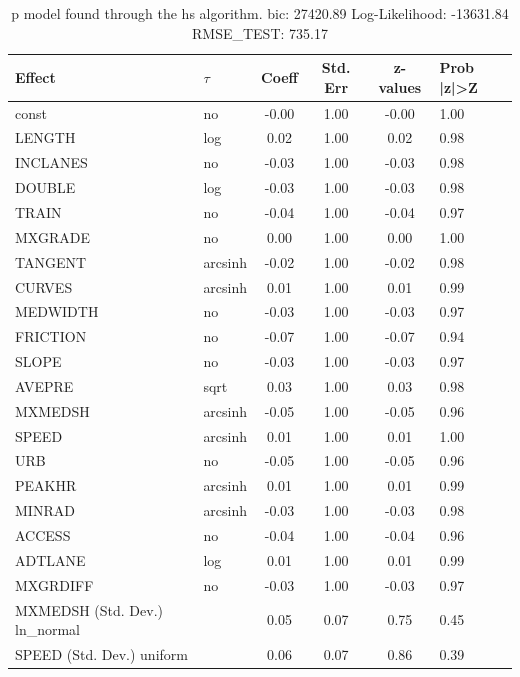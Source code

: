 \begin{table}
	\caption{p model found through the hs algorithm. bic: 27420.89 Log-Likelihood: -13631.84 RMSE_TEST: 735.17}
	\begin{center}
		\begin{tabular}{|l|l|c|c|c|l|}
			\hline
			Effect & $\tau$ & Coeff & Std. Err & z-values & Prob |z|>Z \\
			\hline
			const & no & -0.00 & 1.00 & -0.00 & 1.00 \\
			\hline
			LENGTH & log & 0.02 & 1.00 & 0.02 & 0.98 \\
			\hline
			INCLANES & no & -0.03 & 1.00 & -0.03 & 0.98 \\
			\hline
			DOUBLE & log & -0.03 & 1.00 & -0.03 & 0.98 \\
			\hline
			TRAIN & no & -0.04 & 1.00 & -0.04 & 0.97 \\
			\hline
			MXGRADE & no & 0.00 & 1.00 & 0.00 & 1.00 \\
			\hline
			TANGENT & arcsinh & -0.02 & 1.00 & -0.02 & 0.98 \\
			\hline
			CURVES & arcsinh & 0.01 & 1.00 & 0.01 & 0.99 \\
			\hline
			MEDWIDTH & no & -0.03 & 1.00 & -0.03 & 0.97 \\
			\hline
			FRICTION & no & -0.07 & 1.00 & -0.07 & 0.94 \\
			\hline
			SLOPE & no & -0.03 & 1.00 & -0.03 & 0.97 \\
			\hline
			AVEPRE & sqrt & 0.03 & 1.00 & 0.03 & 0.98 \\
			\hline
			MXMEDSH & arcsinh & -0.05 & 1.00 & -0.05 & 0.96 \\
			\hline
			SPEED & arcsinh & 0.01 & 1.00 & 0.01 & 1.00 \\
			\hline
			URB & no & -0.05 & 1.00 & -0.05 & 0.96 \\
			\hline
			PEAKHR & arcsinh & 0.01 & 1.00 & 0.01 & 0.99 \\
			\hline
			MINRAD & arcsinh & -0.03 & 1.00 & -0.03 & 0.98 \\
			\hline
			ACCESS & no & -0.04 & 1.00 & -0.04 & 0.96 \\
			\hline
			ADTLANE & log & 0.01 & 1.00 & 0.01 & 0.99 \\
			\hline
			MXGRDIFF & no & -0.03 & 1.00 & -0.03 & 0.97 \\
			\hline
			MXMEDSH (Std. Dev.) ln_normal &  & 0.05 & 0.07 & 0.75 & 0.45 \\
			\hline
			SPEED (Std. Dev.) uniform &  & 0.06 & 0.07 & 0.86 & 0.39 \\

\end{tabular}
\end{center}
\end{table}
